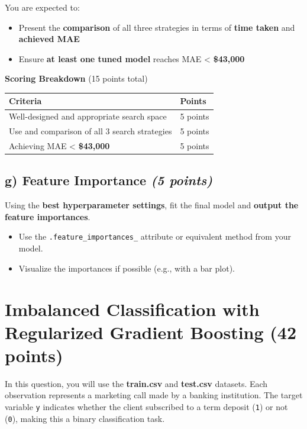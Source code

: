 \documentclass[
  letterpaper,
  DIV=11,
  numbers=noendperiod]{scrreprt}
\providecommand{\tightlist}{%
  \setlength{\itemsep}{0pt}\setlength{\parskip}{0pt}}\usepackage{longtable,booktabs,array}
\begin{document}
You are expected to:

\begin{itemize}
\tightlist
\item
  Present the \textbf{comparison} of all three strategies in terms of
  \textbf{time taken} and \textbf{achieved MAE}
\item
  Ensure \textbf{at least one tuned model} reaches MAE \textless{}
  \textbf{\$43,000}
\end{itemize}

\textbf{Scoring Breakdown} (15 points total)

\begin{longtable}[]{@{}ll@{}}
\toprule\noalign{}
Criteria & Points \\
\midrule\noalign{}
\endhead
\bottomrule\noalign{}
\endlastfoot
Well-designed and appropriate search space & 5 points \\
Use and comparison of all 3 search strategies & 5 points \\
Achieving MAE \textless{} \textbf{\$43,000} & 5 points \\
\end{longtable}

\subsection{\texorpdfstring{g) Feature Importance \emph{(5
points)}}{g) Feature Importance (5 points)}}\label{g-feature-importance-5-points}

Using the \textbf{best hyperparameter settings}, fit the final model and
\textbf{output the feature importances}.

\begin{itemize}
\tightlist
\item
  Use the \texttt{.feature\_importances\_} attribute or equivalent
  method from your model.
\item
  Visualize the importances if possible (e.g., with a bar plot).
\end{itemize}

\section{Imbalanced Classification with Regularized Gradient Boosting
(42
points)}\label{imbalanced-classification-with-regularized-gradient-boosting-42-points}

In this question, you will use the \textbf{train.csv} and
\textbf{test.csv} datasets. Each observation represents a marketing call
made by a banking institution. The target variable \texttt{y} indicates
whether the client subscribed to a term deposit (\texttt{1}) or not
(\texttt{0}), making this a binary classification task.
\end{document}
